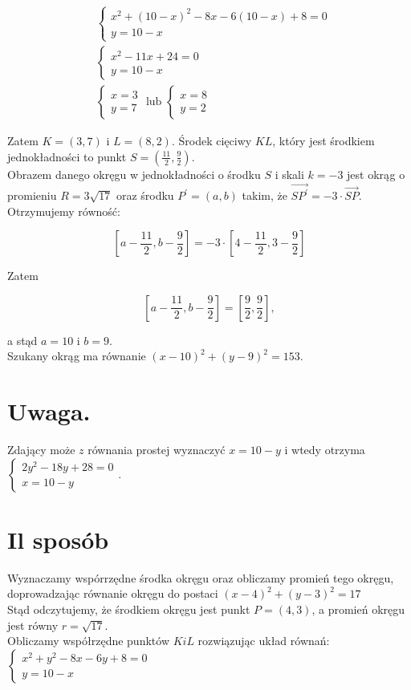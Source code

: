 \documentclass[10pt]{article}
\begin{document}
$$
\begin{aligned}
& \left\{\begin{array}{l}
x^{2}+(10-x)^{2}-8 x-6(10-x)+8=0 \\
y=10-x
\end{array}\right. \\
& \left\{\begin{array}{l}
x^{2}-11 x+24=0 \\
y=10-x
\end{array}\right. \\
& \left\{\begin{array} { l } 
{ x = 3 } \\
{ y = 7 }
\end{array} \text { lub } \left\{\begin{array}{l}
x=8 \\
y=2
\end{array}\right.\right.
\end{aligned}
$$

Zatem $K=(3,7)$ i $L=(8,2)$. Środek cięciwy $K L$, który jest środkiem jednokładności to punkt $S=\left(\frac{11}{2}, \frac{9}{2}\right)$.\\
Obrazem danego okręgu w jednokładności o środku $S$ i skali $k=-3$ jest okrąg o promieniu $R=3 \sqrt{17}$ oraz środku $P^{\prime}=(a, b)$ takim, że $\overrightarrow{S P^{\prime}}=-3 \cdot \overrightarrow{S P}$. Otrzymujemy równość:

$$
\left[a-\frac{11}{2}, b-\frac{9}{2}\right]=-3 \cdot\left[4-\frac{11}{2}, 3-\frac{9}{2}\right]
$$

Zatem

$$
\left[a-\frac{11}{2}, b-\frac{9}{2}\right]=\left[\frac{9}{2}, \frac{9}{2}\right],
$$

a stąd $a=10$ i $b=9$.\\
Szukany okrąg ma równanie $(x-10)^{2}+(y-9)^{2}=153$.

\section*{Uwaga.}
Zdający może $z$ równania prostej wyznaczyć $x=10-y$ i wtedy otrzyma $\left\{\begin{array}{l}2 y^{2}-18 y+28=0 \\ x=10-y\end{array}\right.$.

\section*{Il sposób}
Wyznaczamy wspórrzędne środka okręgu oraz obliczamy promień tego okręgu, doprowadzając równanie okręgu do postaci $(x-4)^{2}+(y-3)^{2}=17$\\
Stąd odczytujemy, że środkiem okręgu jest punkt $P=(4,3)$, a promień okręgu jest równy $r=\sqrt{17}$.\\
Obliczamy współrzędne punktów $K i L$ rozwiązując układ równań: $\left\{\begin{array}{l}x^{2}+y^{2}-8 x-6 y+8=0 \\ y=10-x\end{array}\right.$
\end{document}
